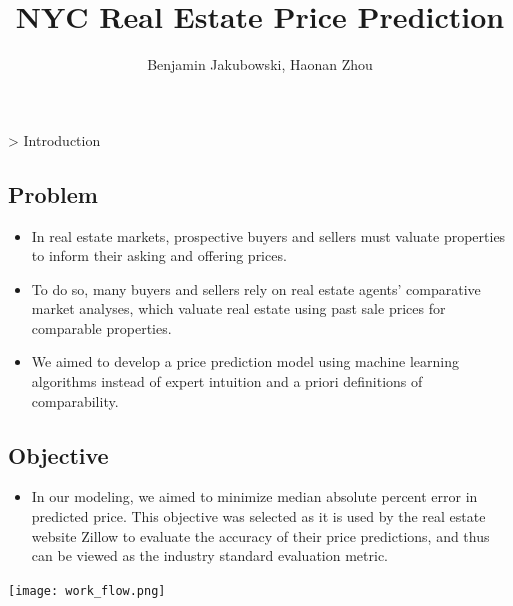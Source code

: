 \documentclass[a0,final]{a0poster}
\title{NYC Real Estate Price Prediction}
\author{Benjamin Jakubowski, Haonan Zhou}
\newenvironment{Section}[1]				%
{
\par 
\flushleft
\colorbox{boxcol}{%
\sffamily\large\color{headingcol}> \color{white} #1%
\hspace{0.5cm}}
\par\nobreak 
\nointerlineskip 						%
\setlength\parskip{-1pt}					%
\begin{lrbox}\envbox						%
\begin{minipage}{0.95\columnwidth}		%
}
{\par
\end{minipage}\end{lrbox}				%
\fcolorbox{boxcol}{fillcol}{\usebox\envbox}	%
\vspace{1cm}							%
}
\begin{document}
\hspace{-3cm}								%
\colorbox{boxcol}{							%
\begin{minipage}{1189mm}					%
\maketitle
\end{minipage}}
\vspace{1cm}

\begin{multicols}{3}							%
\raggedcolumns							%

\begin{Section}{Introduction}
\subsection*{Problem}
\begin{itemize}
\item In real estate markets, prospective buyers and sellers must valuate properties to inform their asking and offering prices.
\item To do so, many buyers and sellers rely on real estate agents' comparative market analyses, which valuate real estate using past sale prices for comparable properties.
\item We aimed to develop a price prediction model using machine learning algorithms instead of expert intuition and a priori definitions of comparability.
\end{itemize}
\subsection*{Objective}
\begin{itemize}
\item In our modeling, we aimed to minimize median absolute percent error in predicted price. This objective was selected as it is used by the real estate website Zillow to evaluate the accuracy of their price predictions, and thus can be viewed as the industry standard evaluation metric.
\end{itemize}
\end{Section}
\noindent \par
\texttt{[image: work\_flow.png]}


\end{multicols}
\end{document}
